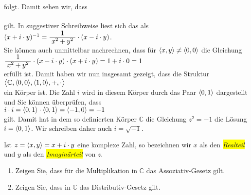 folgt.  Damit sehen wir, dass 
\\[0.2cm]
\hspace*{1.3cm}
\colorbox{red}{}
\\[0.2cm]
gilt.  In suggestiver Schreibweise liest sich das als
\\[0.2cm]
\hspace*{1.3cm}
$(x + i \cdot y)^{-1} = \bruch{1}{x^2 + y^2} \cdot (x  - i \cdot y)$.
\\[0.2cm]
Sie k\"{o}nnen auch unmittelbar nachrechnen, dass f\"{u}r $\pair(x,y) \not= \pair(0,0)$ die Gleichung
\\[0.2cm]
\hspace*{1.3cm}
$\bruch{1}{x^2 + y^2} \cdot (x  - i \cdot y) \cdot (x + i \cdot y) = 1 + i \cdot 0 = 1$ 
\\[0.2cm]
erf\"{u}llt ist.  Damit haben wir nun insgesamt gezeigt, dass die Struktur
\\[0.2cm]
\hspace*{1.3cm}
$\bigl\langle \mathbb{C}, \pair(0,0), \pair(1,0), +, \cdot \bigr\rangle$ 
\\[0.2cm]
ein K\"{o}rper ist.  Die Zahl $i$ wird in diesem K\"{o}rper durch das Paar $\pair(0,1)$ dargestellt und
Sie k\"{o}nnen \"{u}berpr\"{u}fen, dass
\\[0.2cm]
\hspace*{1.3cm}
$i \cdot i = \pair(0,1) \cdot \pair(0,1) = \pair(-1,0) = -1$
\\[0.2cm]
gilt.  Damit hat in dem so definierten K\"{o}rper $\mathbb{C}$ die Gleichung $z^2 = -1$ die L\"{o}sung
$i = \pair(0,1)$.  Wir schreiben daher auch $i = \sqrt{-1}$.

Ist $z = \pair(x,y) = x + i \cdot y$ eine komplexe Zahl, so bezeichnen wir $x$ als den \colorbox{yellow}{\emph{Realteil}}
und $y$ als den \colorbox{yellow}{\emph{Imagin\"{a}rteil}} von $z$.

\exercise
\renewcommand{\labelenumi}{(\alph{enumi})}
\begin{enumerate}
\item Zeigen Sie, dass f\"{u}r die Multiplikation in $\mathbb{C}$ das Assoziativ-Gesetz gilt.
\item Zeigen Sie, dass in $\mathbb{C}$ das Distributiv-Gesetz gilt. \exend
\end{enumerate}
\renewcommand{\labelenumi}{\arabic{enumi}.}


